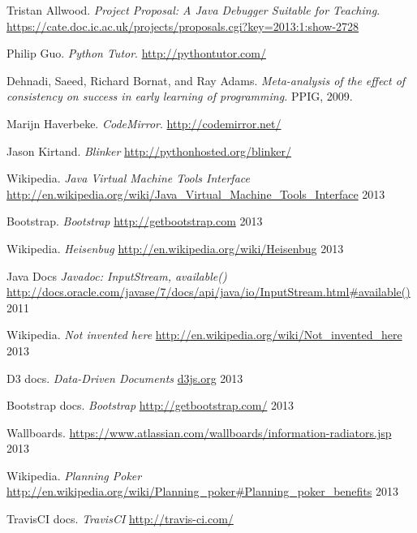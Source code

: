 \documentclass[11pt, a4paper]{article}
\begin{document}
\begin{thebibliography}{20}

	Tristan Allwood.
	\emph{Project Proposal: A Java Debugger Suitable for Teaching}.
	\url{https://cate.doc.ic.ac.uk/projects/proposals.cgi?key=2013:1:show-2728}

	Philip Guo.
	\emph{Python Tutor}.
	\url{http://pythontutor.com/}

	Dehnadi, Saeed, Richard Bornat, and Ray Adams.
	\emph{Meta-analysis of the effect of consistency on success in early learning of programming.}
	PPIG, 2009.

	Marijn Haverbeke.
	\emph{CodeMirror}.
	\url{http://codemirror.net/}

        Jason Kirtand.
        \emph{Blinker}
        \url{http://pythonhosted.org/blinker/}

        Wikipedia.
        \emph{Java Virtual Machine Tools Interface}
        \url{http://en.wikipedia.org/wiki/Java_Virtual_Machine_Tools_Interface}
        2013

        Bootstrap.
        \emph{Bootstrap}
        \url{http://getbootstrap.com}
        2013

        Wikipedia.
        \emph{Heisenbug}
        \url{http://en.wikipedia.org/wiki/Heisenbug}
        2013

        Java Docs
        \emph{Javadoc: InputStream, available()}
        \url{http://docs.oracle.com/javase/7/docs/api/java/io/InputStream.html#available()}
        2011

        Wikipedia.
        \emph{Not invented here}
        \url{http://en.wikipedia.org/wiki/Not_invented_here}
        2013

        D3 docs.
        \emph{Data-Driven Documents}
        \url{d3js.org}
        2013

        Bootstrap docs.
        \emph{Bootstrap}
        \url{http://getbootstrap.com/}
        2013

        Wallboards.
        \url{https://www.atlassian.com/wallboards/information-radiators.jsp}
        2013

        Wikipedia.
        \emph{Planning Poker}
        \url{http://en.wikipedia.org/wiki/Planning\_poker\#Planning\_poker\_benefits}
        2013

        TravisCI docs.
        \emph{TravisCI}
        \url{http://travis-ci.com/}

\end{thebibliography}
\end{document}

